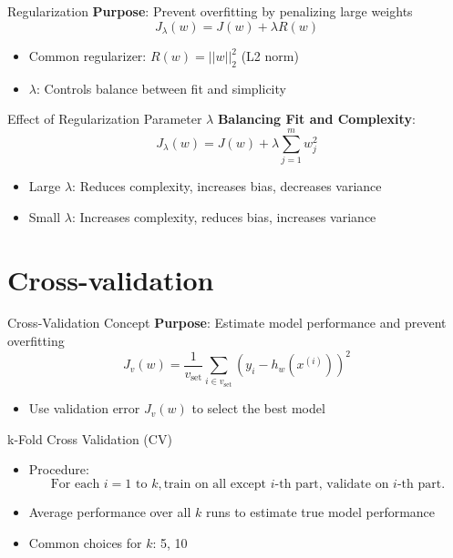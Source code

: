 \documentclass[serif, aspectratio=169]{beamer}
\begin{document}
\begin{frame}{Regularization}
    \textbf{Purpose}: Prevent overfitting by penalizing large weights
    \[
    J_{\lambda}(w) = J(w) + \lambda R(w)
    \]
    \begin{itemize}
        \item Common regularizer: \( R(w) = ||w||_2^2 \) (L2 norm)
        \item \( \lambda \): Controls balance between fit and simplicity
    \end{itemize}
\end{frame}

\begin{frame}{Effect of Regularization Parameter \( \lambda \)}
    \textbf{Balancing Fit and Complexity}:
    \[
    J_{\lambda}(w) = J(w) + \lambda \sum_{j=1}^{m} w_j^2
    \]
    \begin{itemize}
        \item Large \( \lambda \): Reduces complexity, increases bias, decreases variance
        \item Small \( \lambda \): Increases complexity, reduces bias, increases variance
    \end{itemize}
\end{frame}

\section{Cross-validation}
\begin{frame}{Cross-Validation Concept}
    \textbf{Purpose}: Estimate model performance and prevent overfitting
    \[
    J_v(w) = \frac{1}{v_{\text{set}}} \sum_{i \in v_{\text{set}}} (y_i - h_w(x^{(i)}))^2
    \]
    \begin{itemize}
        \item Use validation error \( J_v(w) \) to select the best model
    \end{itemize}
\end{frame}

\begin{frame}{k-Fold Cross Validation (CV)}
  \begin{itemize}
    \item Procedure:
    \[
    \text{For each } i = 1 \text{ to } k, \text{train on all except } i\text{-th part, validate on } i\text{-th part.}
    \]
    \item Average performance over all \( k \) runs to estimate true model performance
    \item Common choices for \( k \): 5, 10
  \end{itemize}
\end{frame}
\end{document}
